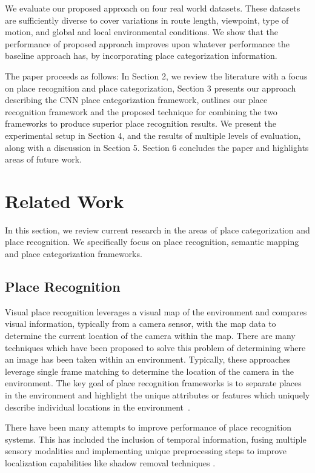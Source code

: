 \documentclass[letterpaper, 10 pt, conference]{ieeeconf}  %
\begin{document}
We evaluate our proposed approach on four real world datasets. These datasets are sufficiently diverse to cover variations in route length, viewpoint, type of motion, and global and local environmental conditions. We show that the performance of proposed approach improves upon whatever performance the baseline approach has, by incorporating place categorization information. 

The paper proceeds as follows: In Section 2, we review the literature with a focus on place recognition and place categorization, Section 3 presents our approach describing the CNN place categorization framework, outlines our place recognition framework and the proposed technique for combining the two frameworks to produce superior place recognition results. We present the experimental setup in Section 4, and the results of multiple levels of evaluation, along with a discussion in Section 5. Section 6 concludes the paper and highlights areas of future work.

\section{Related Work}
In this section, we review current research in the areas of place categorization and place recognition. We specifically focus on place recognition, semantic mapping and place categorization frameworks. 

\subsection{Place Recognition}
Visual place recognition leverages a visual map of the environment and compares visual information, typically from a camera sensor, with the map data to determine the current location of the camera within the map. There are many techniques which have been proposed to solve this problem of determining where an image has been taken within an environment. Typically, these approaches leverage single frame matching to determine the location of the camera in the environment. The key goal of place recognition frameworks is to separate places in the environment and highlight the unique attributes or features which uniquely describe individual locations in the environment~\cite{Cummins2009}. 

There have been many attempts to improve performance of place recognition systems. This has included the inclusion of temporal information, fusing multiple sensory modalities and implementing unique preprocessing steps to improve localization capabilities like shadow removal techniques \cite{corke2013dealing}. 
\end{document}
